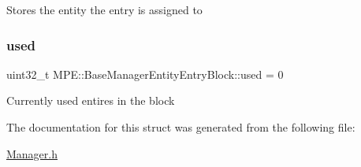 Stores the entity the entry is assigned to \mbox{\label{struct_m_p_e_1_1_base_manager_entity_entry_block_a9bb99ec160ea2058b700023dd7b05d78}} 
\subsubsection{\texorpdfstring{used}{used}}
{\footnotesize\ttfamily uint32\+\_\+t M\+P\+E\+::\+Base\+Manager\+Entity\+Entry\+Block\+::used = 0}

Currently used entires in the block 

The documentation for this struct was generated from the following file\+:\begin{DoxyCompactItemize}
\item 
\hyperlink{_manager_8h}{Manager.\+h}\end{DoxyCompactItemize}
